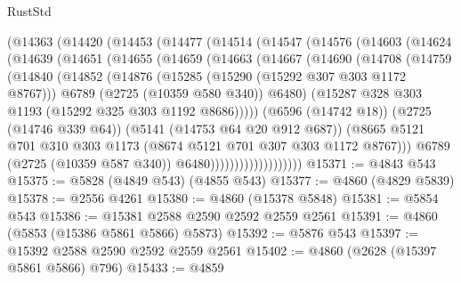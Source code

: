 \begin{lexlean}{RustStd}
\begin{coremodule}
          (@14363
            (@14420
              (@14453
                (@14477
                  (@14514
                    (@14547
                      (@14576
                        (@14603
                          (@14624
                            (@14639
                              (@14651
                                (@14655
                                  (@14659
                                    (@14663
                                      (@14667
                                        (@14690
                                          (@14708
                                            (@14759
                                              (@14840
                                                (@14852
                                                  (@14876
                                                    (@15285 (@15290 (@15292 @307 @303 @1172 @8767)))
                                                    @6789
                                                    (@2725 (@10359 @580 @340))
                                                    @6480)
                                                  (@15287
                                                    @328
                                                    @303
                                                    @1193
                                                    (@15292 @325 @303 @1192 @8686)))))
                                            (@6596 (@14742 @18))
                                            (@2725 (@14746 @339 @64))
                                            (@5141 (@14753 @64 @20 @912 @687))
                                            (@8665
                                              @5121
                                              @701
                                              @310
                                              @303
                                              @1173
                                              (@8674 @5121 @701 @307 @303 @1172 @8767)))
                                          @6789
                                          (@2725 (@10359 @587 @340))
                                          @6480)))))))))))))))))))
@15371 := @4843 @543
@15375 := @5828 (@4849 @543) (@4855 @543)
@15377 := @4860 (@4829 @5839)
@15378 := @2556 @4261
@15380 := @4860 (@15378 @5848)
@15381 := @5854 @543
@15386 := @15381 @2588 @2590 @2592 @2559 @2561
@15391 := @4860 (@5853 (@15386 @5861 @5866) @5873)
@15392 := @5876 @543
@15397 := @15392 @2588 @2590 @2592 @2559 @2561
@15402 := @4860 (@2628 (@15397 @5861 @5866) @796)
@15433 := @4859

\end{coremodule}
\end{lexlean}
